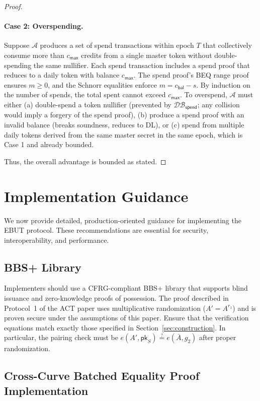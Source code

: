 \documentclass[11pt]{article}
\theoremstyle{definitionstyle}
\theoremstyle{plain}
\newcommand{\DB}{\mathcal{DB}}
\begin{document}
\begin{proof}
\paragraph{Case 2: Overspending.}
Suppose $\mathcal{A}$ produces a set of spend transactions within epoch $T$ that collectively consume more than $c_{\mathsf{max}}$ credits from a single master token without double-spending the same nullifier. Each spend transaction includes a spend proof that reduces to a daily token with balance $c_{\mathsf{max}}$. The spend proof's BEQ range proof ensures $m \ge 0$, and the Schnorr equalities enforce $m = c_{\mathsf{bal}} - s$. By induction on the number of spends, the total spent cannot exceed $c_{\mathsf{max}}$. To overspend, $\mathcal{A}$ must either (a) double-spend a token nullifier (prevented by $\DB_{\mathsf{spend}}$; any collision would imply a forgery of the spend proof), (b) produce a spend proof with an invalid balance (breaks soundness, reduces to DL), or (c) spend from multiple daily tokens derived from the same master secret in the same epoch, which is Case 1 and already bounded.

Thus, the overall advantage is bounded as stated.
\end{proof}

\section{Implementation Guidance}

We now provide detailed, production-oriented guidance for implementing the EBUT protocol. These recommendations are essential for security, interoperability, and performance.

\subsection{BBS+ Library}

Implementers should use a CFRG-compliant BBS+ library that supports blind issuance and zero-knowledge proofs of possession. The proof described in Protocol~1 of the ACT paper uses multiplicative randomization ($A' = A^{r_1}$) and is proven secure under the assumptions of this paper. Ensure that the verification equations match exactly those specified in Section~\ref{sec:construction}. In particular, the pairing check must be $e(A', \mathsf{pk}_S) \stackrel{?}{=} e(\bar{A}, g_2)$ after proper randomization.

\subsection{Cross-Curve Batched Equality Proof Implementation}
\end{document}
